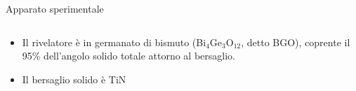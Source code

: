 \documentclass [xcolor=svgnames] {beamer}
\begin{document}
\begin{frame}{Apparato sperimentale}
	\begin{columns}
		\begin{column}{0.45\textwidth}
			\begin{itemize}
				\item<1-> Il rivelatore è in germanato di bismuto (Bi$_{4}$Ge$_{3}$O$_{12}$, detto BGO), coprente il 95\% dell'angolo solido totale attorno al bersaglio.
				\item<3-> Il bersaglio solido è TiN
				

\end{itemize}
\end{column}
\end{columns}
\end{frame}
\end{document}
